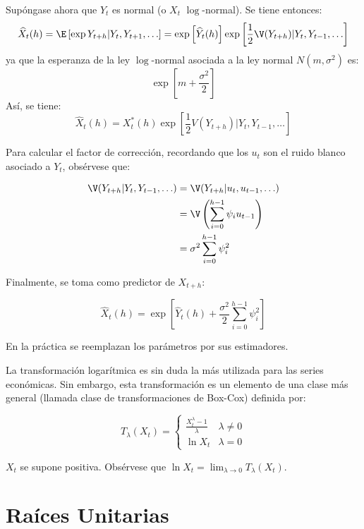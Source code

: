 Sup\'{o}ngase ahora que $Y_{t}$ es normal (o $X_{t}$ $\log$-normal). Se tiene entonces:
\[
\widehat{X} _{t} (h)=\E\left[ \exp Y_{t+h} | Y_{t} ,Y_{t+1} ,\ldots \right]=\exp \left[\widehat{Y}_{t} (h) \right]\exp \left[ \frac{1}{2}\V(Y_{t+h} )| Y_{t},Y_{t-1} ,\ldots \right]
\]
ya que la esperanza de la ley $\log$-normal asociada a la ley normal $N(m, 
\sigma^{2})$ es:
\[
\exp \left[ {m+\frac{\sigma^{2}}{2}} \right]
\]
As\'{i}, se tiene:
\[
\widehat{X} _{t} (h)=X_{t}^{\ast } (h)\exp \left[ {\frac{1}{2}V(Y_{t+h} )| Y_{t} ,Y_{t-1} ,\ldots} \right]
\]

Para calcular el factor de correcci\'{o}n, recordando que los $u_{t}$ son el ruido blanco asociado a $Y_{t}$, obs\'{e}rvese que:

\begin{align*}
\V(Y_{t+h} | Y_{t} ,Y_{t-1} ,\ldots)
	&=\V(Y_{t+h}| u_{t},u_{t-1} ,\ldots) \\ 
	&=\V\left(\sum_{i=0}^{h-1} \psi_{i} u_{t-1} \right) \\ 
	&=\sigma^{2}\sum_{i=0}^{h-1} {\psi_{i}^{2} }
\end{align*}

Finalmente, se toma como predictor de $X_{{t+h}}$:

\[
\widehat{X} _{t} (h)=\exp \left[ {\widehat{Y}_{t} (h)+\frac{\sigma^{2}}{2}\sum_{i=0}^{h-1} {\psi _{i}^{2} } } \right]
\]

En la pr\'{a}ctica se reemplazan los par\'{a}metros por sus estimadores.\newline

La transformaci\'{o}n logar\'{i}tmica es sin duda la m\'{a}s utilizada para las series econ\'{o}micas. Sin embargo, esta transformaci\'{o}n es un elemento de una clase m\'{a}s general (llamada clase de transformaciones de Box-Cox) definida por:

\[
T_{\lambda } (X_{t} )=\begin{cases}
                       \displaystyle\frac{X_{t}^{\lambda } -1}{\lambda }&\lambda \ne 0\\[1mm]
                       \ln X_{t} & \lambda =0
                      \end{cases}
\]

$X_{t}$ se supone positiva. Obs\'{e}rvese que $\ln X_{t}=\lim_{\lambda \to 0} T_{\lambda } (X_{t} )$.


\section{Ra\'{i}ces Unitarias}

